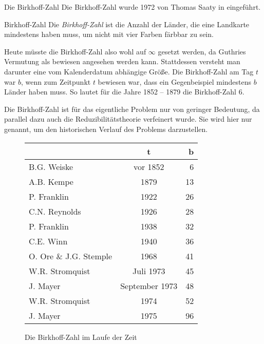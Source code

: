 \begin{section}{Die Birkhoff-Zahl}
 Die Birkhoff-Zahl wurde 1972 von Thomas Saaty in \cite{Saaty} eingeführt.
 
 \begin{definition}{Birkhoff-Zahl}
  Die \textit{Birkhoff-Zahl} ist die Anzahl der Länder, die eine Landkarte mindestens haben muss, um nicht mit vier Farben färbbar zu sein.
 \end{definition}
 
 Heute müsste die Birkhoff-Zahl also wohl auf $\infty$ gesetzt werden, da Guthries Vermutung als bewiesen angesehen werden kann. Stattdessen versteht man darunter eine vom Kalenderdatum abhängige Größe. Die Birkhoff-Zahl am Tag $t$ war $b$, wenn zum Zeitpunkt $t$ bewiesen war, dass ein Gegenbeispiel mindestens $b$ Länder haben muss. So lautet für die Jahre 1852 -- 1879 die Birkhoff-Zahl 6.
 
 Die Birkhoff-Zahl ist für das eigentliche Problem nur von geringer Bedeutung, da parallel dazu auch die Reduzibilitätstheorie verfeinert wurde. Sie wird hier nur genannt, um den historischen Verlauf des Problems darzustellen.
 
 \begin{figure}[hb]
  \label{birkhoffzahl}
  \centering
  \begin{tabular}{l | c | r}
   & t & b \\ \hline
   B.G. Weiske & vor 1852 & 6 \\
   A.B. Kempe & 1879 & 13 \\
   P. Franklin & 1922 & 26 \\
   C.N. Reynolds & 1926 & 28 \\
   P. Franklin & 1938 & 32 \\
   C.E. Winn & 1940 & 36 \\
   O. Ore \& J.G. Stemple & 1968 & 41 \\
   W.R. Stromquist & Juli 1973 & 45 \\
   J. Mayer & September 1973 & 48 \\
   W.R. Stromquist & 1974 & 52 \\
   J. Mayer & 1975 & 96 \\
  \end{tabular}
  \caption[Die Birkhoff-Zahl im Laufe der Zeit]{Die Birkhoff-Zahl im Laufe der Zeit}
 \end{figure}

 
\end{section}
